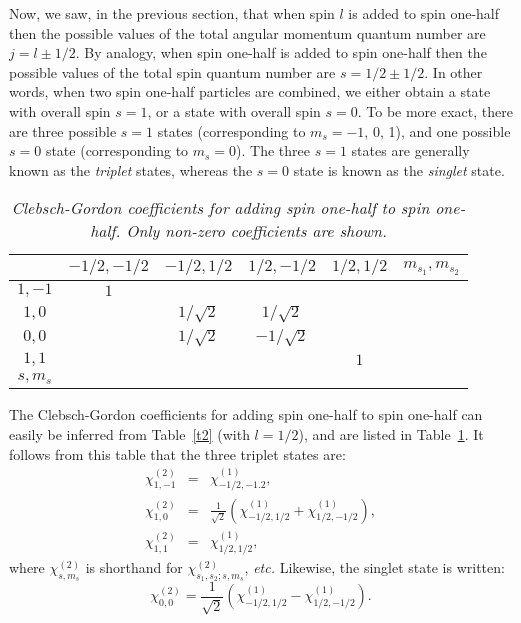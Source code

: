 Now, we saw, in the previous section, that when spin $l$ is added
to spin one-half then the possible values of the total angular momentum
quantum number are $j=l\pm 1/2$. By analogy, when spin one-half
is added to spin one-half then the possible values of the
total spin quantum number are $s=1/2\pm 1/2$. In other words,
when two spin one-half particles are combined, we either obtain 
a state with overall spin $s=1$, or a state with overall spin $s=0$. To be more exact, there are
 three  possible $s=1$ states (corresponding to $m_s=-1$, 0, 1), and
one possible $s=0$ state (corresponding to $m_s=0$). The three $s=1$ states
are generally known as the {\em triplet}\/ states, whereas the
$s=0$ state is known as the {\em singlet}\/ state.

\begin{table}\centering
\begin{tabular}{c|cccc|c}
&$-1/2, -1/2$& $-1/2, 1/2$&$1/2,-1/2$&$1/2,1/2$&$m_{s_1},m_{s_2}$\\[0.5ex]\hline
$1, -1$&${\scriptstyle 1}$&&&&\\[0.5ex]
$1, 0$&&${\scriptstyle 1/\sqrt{2}}$&${\scriptstyle 1/\sqrt{2}}$&&\\[0.5ex]
$0, 0$&&${\scriptstyle 1/\sqrt{2}}$&${\scriptstyle -1/\sqrt{2}}$&&\\[0.5ex]
$1, 1$&&&&${\scriptstyle 1}$&\\
\hline
$s, m_s$&&&&&
\end{tabular}
\caption{\em Clebsch-Gordon coefficients for adding spin one-half to
spin one-half. Only non-zero coefficients are shown.}\label{t4}
\end{table}

The Clebsch-Gordon coefficients for adding spin one-half to
spin one-half can easily be inferred from Table~\ref{t2} (with $l=1/2$),
and are listed in Table~\ref{t4}. It follows from this table that the
three triplet  states are:
\begin{eqnarray}
\chi^{(2)}_{1,-1} &=& \chi^{(1)}_{-1/2,-1.2},\\[0.5ex]
\chi^{(2)}_{1,0} &=& \frac{1}{\sqrt{2}}\left(\chi^{(1)}_{-1/2,1/2}+ \chi^{(1)}_{1/2,-1/2}\right),\\[0.5ex]
\chi^{(2)}_{1,1} &=& \chi^{(1)}_{1/2,1/2},
\end{eqnarray}
where $\chi^{(2)}_{s,m_s}$ is shorthand for $\chi^{(2)}_{s_1,s_2;s,m_s}$,
{\em etc.} Likewise, the singlet
state is written:
\begin{equation}
\chi^{(2)}_{0,0} =  \frac{1}{\sqrt{2}}\left(\chi^{(1)}_{-1/2,1/2}-\chi^{(1)}_{1/2,-1/2}\right).
\end{equation}

